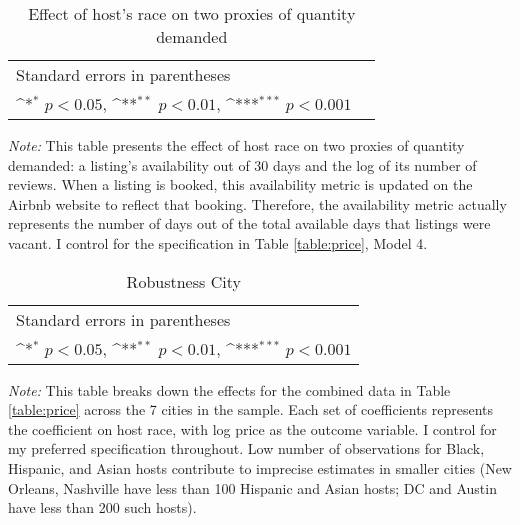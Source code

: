 \begin{table}[htbp]\centering
	\def\sym#1{\ifmmode^{#1}\else\(^{#1}\)\fi}
	\caption{Effect of host’s race on two proxies of quantity demanded}
	\begin{tabular}{l*{2}{c}}
		\hline\hline
		
		\hline\hline
		\multicolumn{2}{l}{\footnotesize Standard errors in parentheses}\\
		\multicolumn{2}{l}{\footnotesize \sym{*} \(p<0.05\), \sym{**} \(p<0.01\), \sym{***} \(p<0.001\)}\\
	\end{tabular}
\label{table:quantity_demanded}
	\begin{tablenotes}
		\item {\it Note:} This table presents the effect of host race on two proxies of quantity demanded: a listing's availability out of 30 days and the log of its number of reviews. When a listing is booked, this availability metric is updated on the Airbnb website to reflect that booking. Therefore, the availability metric actually represents the number of days out of the total available days that listings were vacant. I control for the specification in Table \ref{table:price}, Model 4.
	\end{tablenotes}
\end{table}


\begin{table}[htbp]\centering
	\def\sym#1{\ifmmode^{#1}\else\(^{#1}\)\fi}
	\caption{Robustness City}
	\begin{tabular}{l*{7}{c}}
		\hline\hline
		
		\hline\hline
		\multicolumn{8}{l}{\footnotesize Standard errors in parentheses}\\
		\multicolumn{8}{l}{\footnotesize \sym{*} \(p<0.05\), \sym{**} \(p<0.01\), \sym{***} \(p<0.001\)}\\
	\end{tabular}
	\label{table:robustcity}
	\begin{tablenotes}
		
		\item {\it Note:} This table breaks down the effects for the combined data in Table \ref{table:price} across the 7 cities in the sample. Each set of coefficients represents the coefficient on host race, with log price as the outcome variable. I control for my preferred specification throughout. Low number of observations for Black, Hispanic, and Asian hosts contribute to imprecise estimates in smaller cities (New Orleans, Nashville have less than 100 Hispanic and Asian hosts; DC and Austin have less than 200 such hosts). 
	\end{tablenotes}
\end{table}


